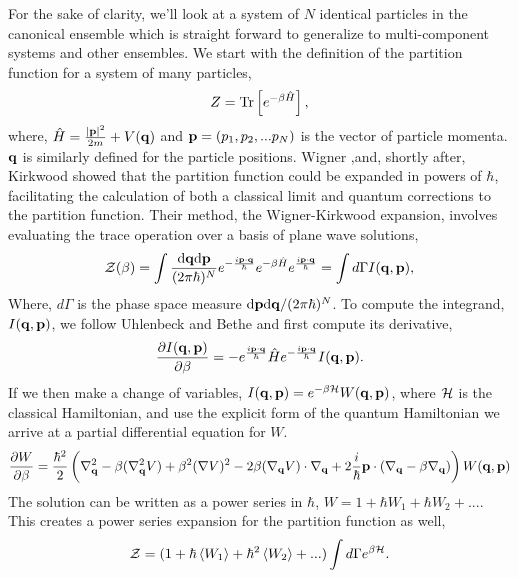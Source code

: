 For the sake of clarity, we'll look at a system of $N$ identical particles in
the canonical ensemble which is straight forward to generalize to
multi-component systems and other ensembles.  We start with the definition of
the partition function for a system of many particles,  
%
\begin{equation}
    Z = \mathrm{Tr}\left[ e^{-\beta\hat{H}} \right], 
\end{equation} 
%
where, $\hat{H} = \frac{\vert\mathbf{p}\vert^2}{2m} + V(\mathbf{q})$ and $\mathbf{p} = (p_1, p_2, ...p_N)$
is the vector of particle momenta.  $\mathbf{q}$ is similarly defined for the particle
positions.  Wigner \cite{PhysRev.40.749},and, shortly after, Kirkwood
\cite{PhysRev.44.31} showed that the partition function could be expanded in
powers of $\hbar$, facilitating the calculation of both a classical limit and
quantum corrections to the partition function.  Their method, the
Wigner-Kirkwood expansion, involves evaluating the trace operation over a basis
of plane wave solutions,
%
\begin{equation}
    \mathcal{Z}(\beta) = \int \frac{\mathrm{d}\mathbf{q} \mathrm{d}\mathbf{p}}{(2\pi \hbar)^N}
        e^{-\frac{i\mathbf{p}\cdot\mathbf{q}}{\hbar}} 
        e^{-\beta \hat{H}} e^{\frac{i\mathbf{p}\cdot\mathbf{q}}{\hbar}} 
        = \int d\Gamma I(\mathbf{q}, \mathbf{p}), 
\end{equation}
%
Where, $d\Gamma$ is the phase space measure
$\mathrm{d}\mathbf{p}\mathrm{d}\mathbf{q}/(2\pi\hbar)^N$.  To compute the integrand, $I(\mathbf{q}, \mathbf{p})$,
we follow Uhlenbeck and Bethe \cite{Uhlenbeck1936729} and first compute its
derivative,
%
\begin{equation}
    \frac{\partial I(\mathbf{q}, \mathbf{p})}{\partial \beta} = -e^{\frac{i\mathbf{p}\cdot\mathbf{q}}{\hbar}}\hat{H}e^{-\frac{i\mathbf{p}\cdot\mathbf{q}}{\hbar}} I(\mathbf{q}, \mathbf{p}).
\end{equation}
%
If we then make a change of variables, $I(\mathbf{q}, \mathbf{p}) = e^{-\beta\mathcal{H}}W(\mathbf{q}, \mathbf{p})$, where
$\mathcal{H}$ is the classical Hamiltonian, and use the explicit form of the quantum
Hamiltonian we arrive at a partial differential equation for $W$.
%
\begin{equation} 
    \frac{\partial W}{\partial \beta} = \frac{\hbar^2}{2} \left(
        \nabla_{\mathbf{q}}^2 
        - \beta(\nabla_{\mathbf{q}}^2V)
        + \beta^2(\nabla V)^2 
        - 2\beta(\nabla_{\mathbf{q}} V)\cdot\nabla_{\mathbf{q}}
        + 2 \frac{i}{\hbar}\mathbf{p}\cdot(\nabla_{\mathbf{q}} -\beta\nabla_{\mathbf{q}}) 
    \right)W(\mathbf{q}, \mathbf{p}) 
\end{equation}
%
The solution can be written as a power series in $\hbar$, $W = 1 + \hbar W_1 +
\hbar W_2 + ...$.  This creates a power series expansion for the partition
function as well,
%
\begin{equation}
    \mathcal{Z} = (1 + \hbar \left\langle W_1 \right\rangle + \hbar^2 \left\langle W_2 \right\rangle+ ...)
        \int d\Gamma e^{\beta\mathcal{H}}.
\end{equation}
